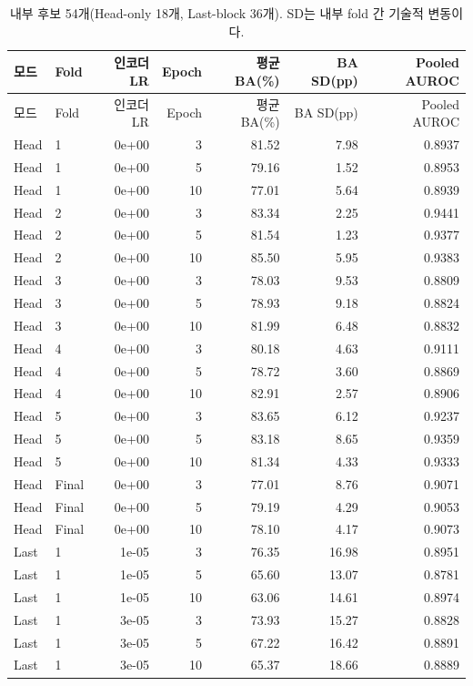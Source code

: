 \documentclass[11pt,a4paper]{article}
\begin{document}
\begin{longtable}{@{}llrrrrr@{}}
\caption{내부 후보 54개(Head-only 18개, Last-block 36개). SD는 내부 fold 간 기술적 변동이다.}\\
\toprule 모드 & Fold & 인코더 LR & Epoch & 평균 BA(\%) & BA SD(pp) & Pooled AUROC\\\midrule\endfirsthead
\toprule 모드 & Fold & 인코더 LR & Epoch & 평균 BA(\%) & BA SD(pp) & Pooled AUROC\\\midrule\endhead
\bottomrule\endfoot
Head & 1 & 0e+00 & 3 & 81.52 & 7.98 & 0.8937 \\
Head & 1 & 0e+00 & 5 & 79.16 & 1.52 & 0.8953 \\
Head & 1 & 0e+00 & 10 & 77.01 & 5.64 & 0.8939 \\
Head & 2 & 0e+00 & 3 & 83.34 & 2.25 & 0.9441 \\
Head & 2 & 0e+00 & 5 & 81.54 & 1.23 & 0.9377 \\
Head & 2 & 0e+00 & 10 & 85.50 & 5.95 & 0.9383 \\
Head & 3 & 0e+00 & 3 & 78.03 & 9.53 & 0.8809 \\
Head & 3 & 0e+00 & 5 & 78.93 & 9.18 & 0.8824 \\
Head & 3 & 0e+00 & 10 & 81.99 & 6.48 & 0.8832 \\
Head & 4 & 0e+00 & 3 & 80.18 & 4.63 & 0.9111 \\
Head & 4 & 0e+00 & 5 & 78.72 & 3.60 & 0.8869 \\
Head & 4 & 0e+00 & 10 & 82.91 & 2.57 & 0.8906 \\
Head & 5 & 0e+00 & 3 & 83.65 & 6.12 & 0.9237 \\
Head & 5 & 0e+00 & 5 & 83.18 & 8.65 & 0.9359 \\
Head & 5 & 0e+00 & 10 & 81.34 & 4.33 & 0.9333 \\
Head & Final & 0e+00 & 3 & 77.01 & 8.76 & 0.9071 \\
Head & Final & 0e+00 & 5 & 79.19 & 4.29 & 0.9053 \\
Head & Final & 0e+00 & 10 & 78.10 & 4.17 & 0.9073 \\
Last & 1 & 1e-05 & 3 & 76.35 & 16.98 & 0.8951 \\
Last & 1 & 1e-05 & 5 & 65.60 & 13.07 & 0.8781 \\
Last & 1 & 1e-05 & 10 & 63.06 & 14.61 & 0.8974 \\
Last & 1 & 3e-05 & 3 & 73.93 & 15.27 & 0.8828 \\
Last & 1 & 3e-05 & 5 & 67.22 & 16.42 & 0.8891 \\
Last & 1 & 3e-05 & 10 & 65.37 & 18.66 & 0.8889 \\

\end{longtable}
\end{document}
